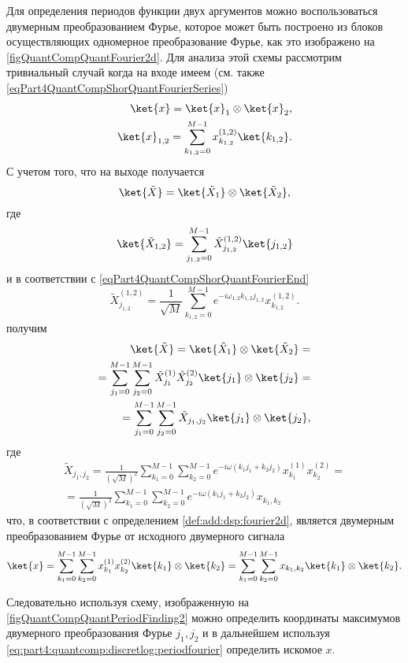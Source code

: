 Для определения периодов функции двух аргументов можно воспользоваться
двумерным преобразованием Фурье, которое может быть построено из
блоков осуществляющих одномерное преобразование Фурье, как это
изображено на \autoref{figQuantCompQuantFourier2d}. Для анализа этой
схемы рассмотрим тривиальный случай когда
на входе имеем (см. также \eqref{eqPart4QuantCompShorQuantFourierSeries})
\begin{eqnarray}
\ket{x} = \ket{x}_1 \otimes \ket{x}_2,
\nonumber \\
\ket{x}_{1,2} = \sum_{k_{1,2} = 0}^{M-1} x_{k_{1,2}}^{(1,2)} \ket{k_{1,2}}.
\nonumber
\end{eqnarray}
С учетом того, что на выходе получается
\[
\ket{\tilde{X}} = \ket{\tilde{X}_1} \otimes \ket{\tilde{X}_2},
\]
где
\[
\ket{\tilde{X}_{1,2}} = \sum_{j_{1,2} = 0}^{M-1} \tilde{X}_{j_{1,2}}^{(1,2)} \ket{j_{1,2}}
\]
и в соответствии с \eqref{eqPart4QuantCompShorQuantFourierEnd}
\[
\tilde{X}_{j_{1,2}}^{(1,2)} = \frac{1}{\sqrt{M}}\sum_{k_{1,2} = 0}^{M - 1}e^{-i \omega_{1,2} k_{1,2} j_{1,2}} x_{k_{1,2}}^{(1,2)}.
\]
получим
\begin{eqnarray}
\ket{\tilde{X}} = \ket{\tilde{X}_1} \otimes \ket{\tilde{X}_2} = 
\nonumber \\
= \sum_{j_1 = 0}^{M-1}\sum_{j_2 = 0}^{M-1}
\tilde{X}_{j_{1}}^{(1)} \tilde{X}_{j_{2}}^{(2)} \ket{j_1} \otimes
\ket{j_2} =
\nonumber \\
= \sum_{j_1 = 0}^{M-1}\sum_{j_2 = 0}^{M-1}
\tilde{X}_{j_{1},j_{2}} \ket{j_1} \otimes
\ket{j_2}, 
\nonumber
\end{eqnarray}
где
\begin{eqnarray}
\tilde{X}_{j_{1},j_{2}} = \frac{1}{\left( \sqrt{M} \right)^2} 
\sum_{k_{1} = 0}^{M - 1}\sum_{k_{2} = 0}^{M - 1}
e^{-i \omega \left( k_{1} j_{1} + k_{2} j_{2}\right)}
x_{k_1}^{(1)}x_{k_2}^{(2)} =
\nonumber \\
= \frac{1}{\left( \sqrt{M} \right)^2}
\sum_{k_{1} = 0}^{M - 1}\sum_{k_{2} = 0}^{M - 1}
e^{-i \omega \left( k_{1} j_{1} + k_{2} j_{2}\right)}
x_{k_1, k_2}
\nonumber
\end{eqnarray}
что, в соответствии с определением \ref{def:add:dsp:fourier2d},
является двумерным преобразованием Фурье от исходного двумерного 
сигнала
\[
\ket{x} = 
\sum_{k_1 = 0}^{M-1}\sum_{k_2 = 0}^{M-1}
x_{k_1}^{(1)}x_{k_2}^{(2)} \ket{k_1} \otimes \ket{k_2} =
\sum_{k_1 = 0}^{M-1}\sum_{k_2 = 0}^{M-1}
x_{k_1,k_2} \ket{k_1} \otimes \ket{k_2}.  
\]



Следовательно используя схему, изображенную на
\autoref{figQuantCompQuantPeriodFinding2} можно определить координаты
максимумов двумерного преобразования Фурье $j_1, j_2$ и в дальнейшем используя
\eqref{eq:part4:quantcomp:discretlog:periodfourier} определить искомое $x$.


